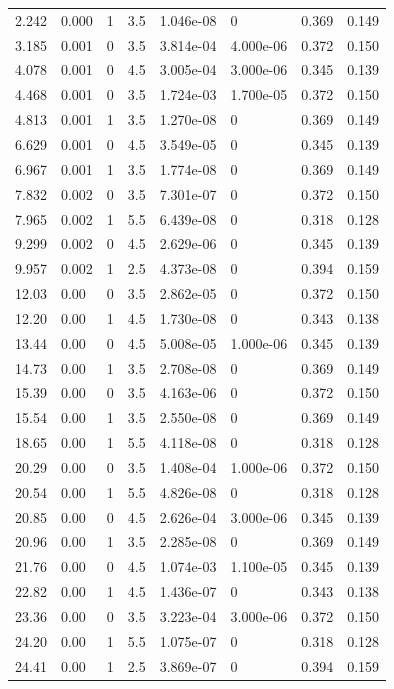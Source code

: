 \documentclass[preview]{standalone}
\begin{document}
{{\begin{tabular}{L{1.2cm}C{1.2cm} C{0.3cm}C{0.5cm} C{1.4cm}C{1.4cm} C{1.4cm}C{1.4cm}}
  2.242  &  0.000  & 1     & 3.5 &  1.046e-08  & 0  & 0.369 &  0.149   \\ 
  3.185  &  0.001  & 0     & 3.5 &  3.814e-04  & 4.000e-06  & 0.372 &  0.150   \\ 
  4.078  &  0.001  & 0     & 4.5 &  3.005e-04  & 3.000e-06  & 0.345 &  0.139   \\ 
  4.468  &  0.001  & 0     & 3.5 &  1.724e-03  & 1.700e-05  & 0.372 &  0.150   \\ 
  4.813  &  0.001  & 1     & 3.5 &  1.270e-08  & 0  & 0.369 &  0.149   \\ 
  6.629  &  0.001  & 0     & 4.5 &  3.549e-05  & 0  & 0.345 &  0.139   \\ 
  6.967  &  0.001  & 1     & 3.5 &  1.774e-08  & 0  & 0.369 &  0.149   \\ 
  7.832  &  0.002  & 0     & 3.5 &  7.301e-07  & 0  & 0.372 &  0.150   \\ 
  7.965  &  0.002  & 1     & 5.5 &  6.439e-08  & 0  & 0.318 &  0.128   \\ 
  9.299  &  0.002  & 0     & 4.5 &  2.629e-06  & 0  & 0.345 &  0.139   \\ 
  9.957  &  0.002  & 1     & 2.5 &  4.373e-08  & 0  & 0.394 &  0.159   \\ 
  12.03  &  0.00  & 0     & 3.5 &  2.862e-05  & 0  & 0.372 &  0.150   \\ 
  12.20  &  0.00  & 1     & 4.5 &  1.730e-08  & 0  & 0.343 &  0.138   \\ 
  13.44  &  0.00  & 0     & 4.5 &  5.008e-05  & 1.000e-06  & 0.345 &  0.139   \\ 
  14.73  &  0.00  & 1     & 3.5 &  2.708e-08  & 0  & 0.369 &  0.149   \\ 
  15.39  &  0.00  & 0     & 3.5 &  4.163e-06  & 0  & 0.372 &  0.150   \\ 
  15.54  &  0.00  & 1     & 3.5 &  2.550e-08  & 0  & 0.369 &  0.149   \\ 
  18.65  &  0.00  & 1     & 5.5 &  4.118e-08  & 0  & 0.318 &  0.128   \\ 
  20.29  &  0.00  & 0     & 3.5 &  1.408e-04  & 1.000e-06  & 0.372 &  0.150   \\ 
  20.54  &  0.00  & 1     & 5.5 &  4.826e-08  & 0  & 0.318 &  0.128   \\ 
  20.85  &  0.00  & 0     & 4.5 &  2.626e-04  & 3.000e-06  & 0.345 &  0.139   \\ 
  20.96  &  0.00  & 1     & 3.5 &  2.285e-08  & 0  & 0.369 &  0.149   \\ 
  21.76  &  0.00  & 0     & 4.5 &  1.074e-03  & 1.100e-05  & 0.345 &  0.139   \\ 
  22.82  &  0.00  & 1     & 4.5 &  1.436e-07  & 0  & 0.343 &  0.138   \\ 
  23.36  &  0.00  & 0     & 3.5 &  3.223e-04  & 3.000e-06  & 0.372 &  0.150   \\ 
  24.20  &  0.00  & 1     & 5.5 &  1.075e-07  & 0  & 0.318 &  0.128   \\ 
  24.41  &  0.00  & 1     & 2.5 &  3.869e-07  & 0  & 0.394 &  0.159   \\ 
\hline 
\end{tabular} 

}}
\end{document}

